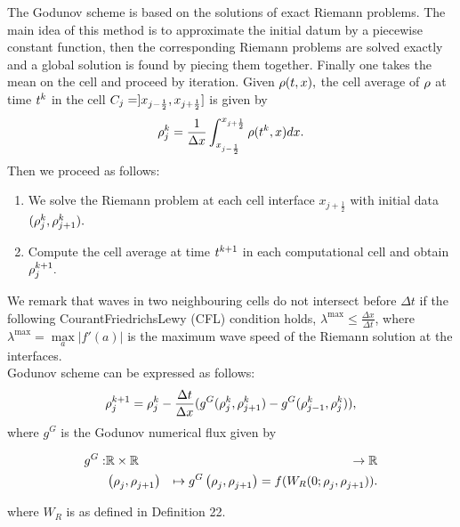 The Godunov scheme is based on the solutions of exact Riemann problems. The main idea of this method is to approximate the initial datum by a piecewise constant function, then the corresponding Riemann problems are solved exactly and a global solution is found by piecing them together. Finally one takes the mean on the cell and proceed by iteration. Given $\rho(t,x),$ the cell average of $\rho$ at time $t^{k}$ in the cell $C_{j}=]x_{j-\frac{1}{2}},x_{j+\frac{1}{2}}]$ is given by 
\begin{equation}
\rho_{j}^{k}=\dfrac{1}{\Delta x}\int_{x_{j-\frac{1}{2}}}^{x_{j+\frac{1}{2}}}\rho(t^{k},x)dx.\label{eq:godproj}
\end{equation}
Then we proceed as follows:
\begin{enumerate}
	\item We solve the Riemann problem at each cell interface $x_{j+\frac{1}{2}}$ with initial data $(\rho^{k}_{j},\rho^{k}_{j+1}).$
	\item Compute the cell average at time $t^{k +1}$ in each computational cell and obtain $\rho^{k +1}_{j}.$ 
\end{enumerate}

We remark that waves in two neighbouring cells do not intersect before $\Delta t$ if the following Courant\textendash{}Friedrichs\textendash{}Lewy (CFL) condition holds, $\lambda^{\max}\le\frac{\Delta x}{\Delta t}$, where $\lambda^{\max}=\underset{a}{\max}|f'\left(a\right)|$ is the maximum wave speed of the Riemann solution at the interfaces.\\
Godunov scheme can be expressed as follows:
\begin{equation}
\rho_{j}^{k+1}=\rho_{j}^{k}-\frac{\Delta t}{\Delta x}(g^{G}(\rho_{j}^{k},\rho_{j+1}^{k})-g^{G}(\rho_{j-1}^{k},\rho_{j}^{k})),\label{eq:godscheme}
\end{equation}
where $g^{G}$ is the Godunov numerical flux given by

\begin{eqnarray*}
g^{G}: & \mathbb{R}\times\mathbb{R} & \rightarrow\mathbb{R}\\
 & \left(\rho_{j}^{},\rho_{j+1}^{}\right) & \mapsto g^{G}\left(\rho_{j}^{},\rho_{j+1}^{}\right)=f(W_{R}(0;\rho_{j}^{},\rho_{j+1}^{})).
\end{eqnarray*}

where $W_{R}$ is as defined in Definition 22.


